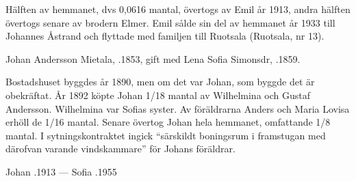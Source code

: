 Hälften av hemmanet, dvs 0,0616 mantal, övertogs av Emil år 1913, andra hälften övertogs senare av brodern Elmer. Emil sålde sin del av hemmanet år 1933 till Johannes Åstrand och flyttade med familjen till Ruotsala (Ruotsala, nr 13).


%
Johan Andersson Mietala, .1853, gift med Lena Sofia Simonsdr, .1859.
\begin{jhchildren}
  \item {}
  \item {}
  \item {}
  \item {}
  \item {}
  \item {}
  \item {}
  \item {}
\end{jhchildren}

Bostadshuset byggdes år 1890, men om det var Johan, som byggde det är obekräftat. År 1892 köpte Johan 1/18 mantal av Wilhelmina och Gustaf Andersson. Wilhelmina var Sofias syster. Av föräldrarna Anders och Maria Lovisa erhöll de 1/16 mantal. Senare övertog Johan hela hemmanet, omfattande 1/8 mantal. I sytningskontraktet ingick ``särskildt boningsrum i framstugan med därofvan varande vindskammare'' för Johans föräldrar.

Johan .1913  ---  Sofia .1955


